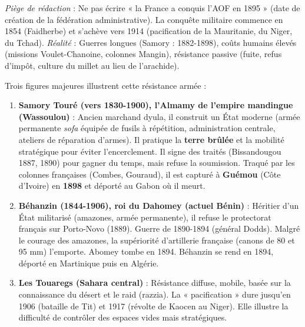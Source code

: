 \documentclass[11pt]{article}
\begin{document}
\begin{attention}
\emph{Piège de rédaction} : Ne pas écrire « la France a conquis l'AOF en 1895 » (date de création de la fédération administrative). La conquête militaire commence en 1854 (Faidherbe) et s'achève vers 1914 (pacification de la Mauritanie, du Niger, du Tchad).
\emph{Réalité} : Guerres longues (Samory : 1882-1898), coûts humains élevés (missions Voulet-Chanoine, colonnes Mangin), résistance passive (fuite, refus d'impôt, culture du millet au lieu de l'arachide).
\end{attention}

Trois figures majeures illustrent cette résistance armée :

\begin{enumerate}
    \item \textbf{Samory Touré (vers 1830-1900), l'Almamy de l'empire mandingue (Wassoulou)} :
        Ancien marchand dyula, il construit un État moderne (armée permanente \emph{sofa} équipée de fusils à répétition, administration centrale, ateliers de réparation d'armes). Il pratique la \textbf{terre brûlée} et la mobilité stratégique pour éviter l'encerclement. Il signe des traités (Bissandougou 1887, 1890) pour gagner du temps, mais refuse la soumission. Traqué par les colonnes françaises (Combes, Gouraud), il est capturé à \textbf{Guémou} (Côte d'Ivoire) en \textbf{1898} et déporté au Gabon où il meurt.
    \item \textbf{Béhanzin (1844-1906), roi du Dahomey (actuel Bénin)} :
        Héritier d'un État militarisé (amazones, armée permanente), il refuse le protectorat français sur Porto-Novo (1889). Guerre de 1890-1894 (général Dodds). Malgré le courage des amazones, la supériorité d'artillerie française (canons de 80 et 95 mm) l'emporte. Abomey tombe en 1894. Béhanzin se rend en 1894, déporté en Martinique puis en Algérie.
    \item \textbf{Les Touaregs (Sahara central)} :
        Résistance diffuse, mobile, basée sur la connaissance du désert et le raid (razzia). La « pacification » dure jusqu'en 1906 (bataille de Tit) et 1917 (révolte de Kaocen au Niger). Elle illustre la difficulté de contrôler des espaces vides mais stratégiques.
\end{enumerate}
\end{document}
